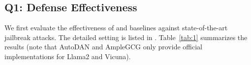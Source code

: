 




\subsection{Q1: Defense Effectiveness}
\label{sec:defense}
We first evaluate the effectiveness of \rkv and baselines against state-of-the-art jailbreak attacks. The detailed setting is listed in . Table~\ref{tab:1} summarizes the results (note that AutoDAN and AmpleGCG only provide official implementations for Llama2 and Vicuna).



